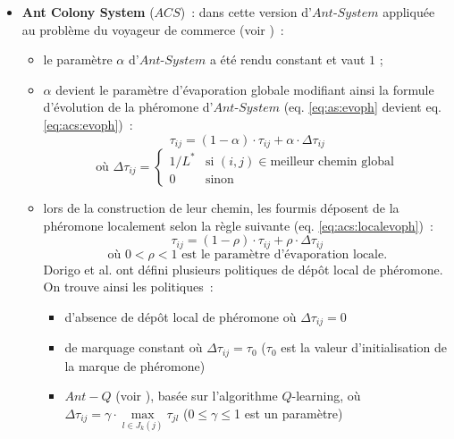 \begin{itemize}
 \item \textbf{Ant Colony System} ($ACS$)~: dans cette version d'$Ant$-$System$ appliquée au problème du voyageur de commerce (voir \cite{Dorigo1997})~:
  \begin{itemize}
    \item le paramètre $\alpha$ d'$Ant$-$System$ a été rendu constant et vaut $1$ ;
    \item $\alpha$ devient le paramètre d'évaporation globale modifiant ainsi la formule d'évolution de la phéromone d'$Ant$-$System$ (eq. \ref{eq:as:evoph} devient eq. \ref{eq:acs:evoph})~: 
    \begin{equation}
      \tau_{ij}=(1-\alpha) \cdot \tau_{ij} + \alpha \cdot \Delta\tau_{ij}
      \label{eq:acs:evoph}
    \end{equation}
    \begin{equation*}
	\text{où } \Delta\tau_{ij}=
       \begin{cases}
        1/L^* & \text{si } (i,j)\in \text{meilleur chemin global}\\
        0 & \text{sinon}
       \end{cases}
    \end{equation*}
    \item lors de la construction de leur chemin, les fourmis déposent de la phéromone localement selon la règle suivante (eq. \ref{eq:acs:localevoph})~: 
    \begin{equation}
      \tau_{ij}=(1-\rho) \cdot \tau_{ij} + \rho \cdot \Delta\tau_{ij}
      \label{eq:acs:localevoph}
    \end{equation}
    \begin{equation*}
      \text{où } 0<\rho<1 \text{ est le paramètre d'évaporation locale.}
    \end{equation*}
    Dorigo et al. ont défini plusieurs politiques de dépôt local de phéromone. On trouve ainsi les politiques~: 
      \begin{itemize}
       \item d'absence de dépôt local de phéromone où $\Delta\tau_{ij}=0$
       \item de marquage constant où $\Delta\tau_{ij}=\tau_0$ ($\tau_0$ est la valeur d'initialisation de la marque de phéromone)
       \item $Ant-Q$ (voir \cite{Gambardella1995}), basée sur l'algorithme $Q$-learning, où $\Delta\tau_{ij}= \gamma \cdot \max\limits_{l \in J_k(j)} \tau_{jl}$ (0$\leq\gamma\leq$1 est un paramètre)
      \end{itemize}

\end{itemize}
\end{itemize}
